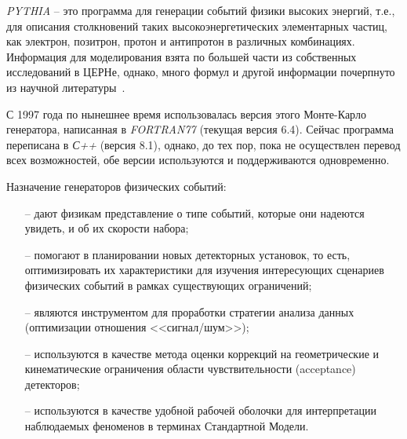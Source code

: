 \textit{PYTHIA} -- это программа для генерации событий физики
высоких энергий, т.е., для описания столкновений таких
высокоэнергетических элементарных частиц, как электрон,
позитрон, протон и антипротон в различных комбинациях.
Информация для моделирования взята по большей части из
собственных исследований в ЦЕРНе, однако, много формул и
другой информации почерпнуто из научной литературы~\cite{review-pythia}.

С 1997 года по нынешнее время использовалась версия
этого Монте-Карло генератора, написанная в \textit{FORTRAN77}
(текущая версия 6.4). Сейчас программа переписана в \textit{С++}
(версия 8.1), однако, до тех пор, пока не осуществлен
перевод всех возможностей, обе версии используются и
поддерживаются одновременно.


Назначение генераторов физических событий:
\begin{enumerate}
	\item[--] дают физикам представление о типе событий, которые
	они надеются увидеть, и об их скорости набора;
	\item[--] помогают в планировании новых детекторных установок,
	то есть, оптимизировать их характеристики для изучения
	интересующих сценариев физических событий в рамках
	существующих ограничений;
	\item[--] являются инструментом для проработки стратегии
	анализа данных (оптимизации отношения <<сигнал/шум>>);
	\item[--] используются в качестве метода оценки коррекций на
	геометрические и кинематические ограничения области
	чувствительности (acceptance) детекторов;
	\item[--] используются в качестве удобной рабочей оболочки для
	интерпретации наблюдаемых феноменов в терминах
	Стандартной Модели.
\end{enumerate}

